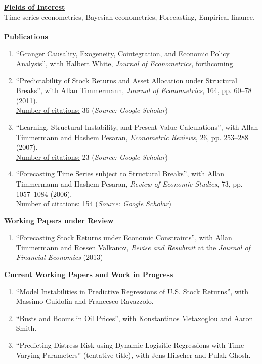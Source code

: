 \documentclass[12pt]{article}
\begin{document}
\underline{\textbf{Fields of Interest}}\\
Time-series econometrics, Bayesian econometrics, Forecasting, Empirical finance.\\ \\
\underline{\textbf{Publications}}
\begin{enumerate}	
	\item ``Granger Causality, Exogeneity, Cointegration, and Economic Policy Analysis'', with Halbert White, \emph{Journal of Econometrics}, forthcoming.
	
	\item ``Predictability of Stock Returns and Asset Allocation under Structural Breaks'', with Allan Timmermann, \emph{Journal of Econometrics}, 164, pp. 60--78 (2011). \\
	\underline{Number of citations:} 36 (\emph{Source: Google Scholar})
	
	\item ``Learning, Structural Instability, and Present Value Calculations'', with Allan Timmermann and Hashem Pesaran, \emph{Econometric Reviews}, 26, pp. 253--288 (2007). \\
	\underline{Number of citations:} 23 (\emph{Source: Google Scholar})

	\item ``Forecasting Time Series subject to Structural Breaks'', with Allan Timmermann and Hashem Pesaran, \emph{Review of Economic Studies}, 73, pp. 1057--1084 (2006). \\
	\underline{Number of citations:} 154 (\emph{Source: Google Scholar})

    \setcounter{enumTemp}{\theenumi}
 \end{enumerate}
\underline{\textbf{Working Papers under Review}}
\begin{enumerate}
	\setcounter{enumi}{\theenumTemp}
	\item ``Forecasting Stock Returns under Economic Constraints'', with Allan Timmermann and Rossen Valkanov, \emph{Revise and Resubmit} at the \emph{Journal of Financial Economics} (2013)
    \setcounter{enumTemp}{\theenumi}
\end{enumerate}

\underline{\textbf{Current Working Papers and Work in Progress}}
\begin{enumerate}
	\setcounter{enumi}{\theenumTemp}
	\item ``Model Instabilities in Predictive Regressions of U.S. Stock Returns'', with Massimo Guidolin and Francesco Ravazzolo.
	\item ``Busts and Booms in Oil Prices'', with Konstantinos Metaxoglou  and Aaron Smith.
	\item ``Predicting Distress Risk using Dynamic Logisitic Regressions with Time Varying Parameters'' (tentative title), with Jens Hilscher and Pulak Ghosh.
\end{enumerate}
\end{document}
